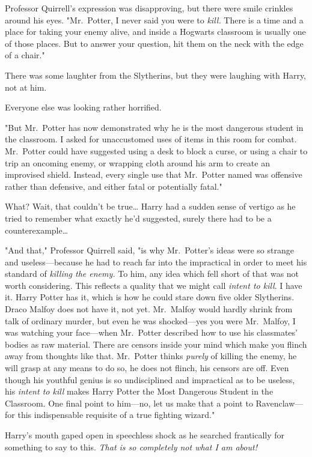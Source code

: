 Professor Quirrell's expression was disapproving, but there were smile crinkles 
around his eyes. "Mr.~Potter, I never said you were to \emph{kill.} There is a 
time and a place for taking your enemy alive, and inside a Hogwarts classroom 
is usually one of those places. But to answer your question, hit them on the 
neck with the edge of a chair."

There was some laughter from the Slytherins, but they were laughing with Harry, 
not at him.

Everyone else was looking rather horrified.

"But Mr.~Potter has now demonstrated why he is the most dangerous student in 
the classroom. I asked for unaccustomed uses of items in this room for combat. 
Mr.~Potter could have suggested using a desk to block a curse, or using a chair 
to trip an oncoming enemy, or wrapping cloth around his arm to create an 
improvised shield. Instead, every single use that Mr.~Potter named was 
offensive rather than defensive, and either fatal or potentially fatal."

What? Wait, that couldn't be true{\ldots} Harry had a sudden sense of vertigo 
as he tried to remember what exactly he'd suggested, surely there had to be a 
counterexample{\ldots}

"And that," Professor Quirrell said, "is why Mr.~Potter's ideas were so strange 
and useless---because he had to reach far into the impractical in order to meet 
his standard of \emph{killing the enemy.} To him, any idea which fell short of 
that was not worth considering. This reflects a quality that we might call 
\emph{intent to kill}. I have it. Harry Potter has it, which is how he could 
stare down five older Slytherins. Draco Malfoy does not have it, not yet. 
Mr.~Malfoy would hardly shrink from talk of ordinary murder, but even he was 
shocked---yes you were Mr.~Malfoy, I was watching your face---when Mr.~Potter 
described how to use his classmates' bodies as raw material. There are censors 
inside your mind which make you flinch away from thoughts like that. Mr.~Potter 
thinks \emph{purely} of killing the enemy, he will grasp at any means to do so, 
he does not flinch, his censors are off. Even though his youthful genius is so 
undisciplined and impractical as to be useless, his \emph{intent to kill} makes 
Harry Potter the Most Dangerous Student in the Classroom. One final point to 
him---no, let us make that a point to Ravenclaw---for this indispensable 
requisite of a true fighting wizard."

Harry's mouth gaped open in speechless shock as he searched frantically for 
something to say to this. \emph{That is so completely not what I am about!}

